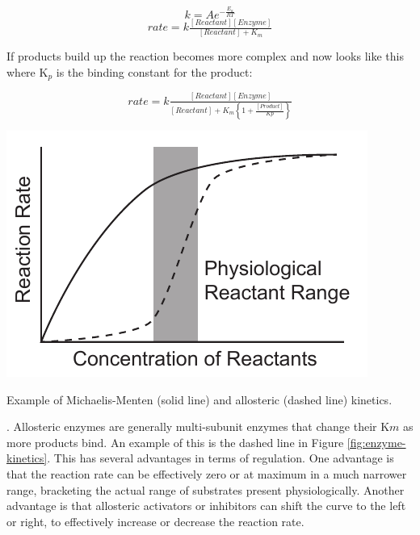 \documentclass{tufte-handout}
\begin{document}
\begin{equation}
k = A e^{-\frac{E_{a}}{RT}} 
\end{equation}
\begin{equation}
rate = k\tfrac{[Reactant][Enzyme]}{[Reactant] + K_{m}}
\end{equation}

If products build up the reaction becomes more complex and now looks like this where K$_{p}$ is the binding constant for the product:

\begin{equation}
rate = k\tfrac{[Reactant][Enzyme]}{[Reactant] +K_{m}\left \{ 1 + \frac{[Product]}{Kp} \right \}}
\end{equation}

\begin{marginfigure}
\includegraphics[width=\marginparwidth]{figures/enzyme-kinetics.pdf}\
\caption{Example of Michaelis-Menten (solid line) and allosteric (dashed line) kinetics.}
\label{fig:enzyme-kinetics}
\end{marginfigure}

.  Allosteric enzymes are generally multi-subunit enzymes that change their K${m}$ as more products bind.  An example of this is the dashed line in Figure \ref{fig:enzyme-kinetics}.  This has several advantages in terms of regulation.  One advantage is that the reaction rate can be effectively zero or at maximum in a much narrower range, bracketing the actual range of substrates present physiologically.  Another advantage is that allosteric activators or inhibitors can shift the curve to the left or right, to effectively increase or decrease the reaction rate. 
\end{document}
